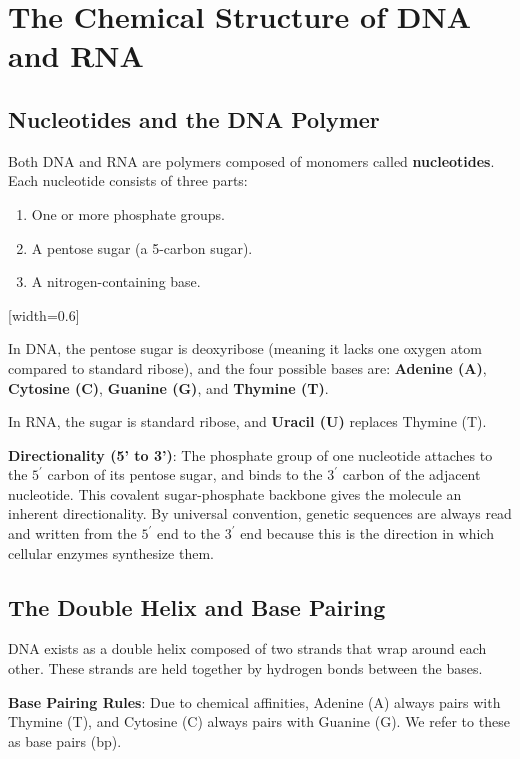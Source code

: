\section{The Chemical Structure of DNA and RNA}

\subsection{Nucleotides and the DNA Polymer}
Both DNA and RNA are polymers composed of monomers called \textbf{nucleotides}. Each nucleotide consists of three parts:
\begin{enumerate}
  \item One or more phosphate groups.
  \item A pentose sugar (a 5-carbon sugar).
  \item A nitrogen-containing base.
\end{enumerate}
\vspace{1em}
[width=0.6\textwidth]

In DNA, the pentose sugar is deoxyribose (meaning it lacks one oxygen atom compared to standard ribose), and the four possible bases are: \textbf{Adenine (A)}, \textbf{Cytosine (C)}, \textbf{Guanine (G)}, and \textbf{Thymine (T)}. 

In RNA, the sugar is standard ribose, and \textbf{Uracil (U)} replaces Thymine (T). 

\begin{important}
  \textbf{Directionality (5' to 3')}: The phosphate group of one nucleotide attaches to the $5^{\prime}$ carbon of its pentose sugar, and binds to the $3^{\prime}$ carbon of the adjacent nucleotide. This covalent sugar-phosphate backbone gives the molecule an inherent directionality. By universal convention, genetic sequences are always read and written from the $5^{\prime}$ end to the $3^{\prime}$ end because this is the direction in which cellular enzymes synthesize them.
\end{important}

\subsection{The Double Helix and Base Pairing}
DNA exists as a double helix composed of two strands that wrap around each other. These strands are held together by hydrogen bonds between the bases. 

\begin{important}
  \textbf{Base Pairing Rules}: Due to chemical affinities, Adenine (A) always pairs with Thymine (T), and Cytosine (C) always pairs with Guanine (G). We refer to these as base pairs (bp).
\end{important}

